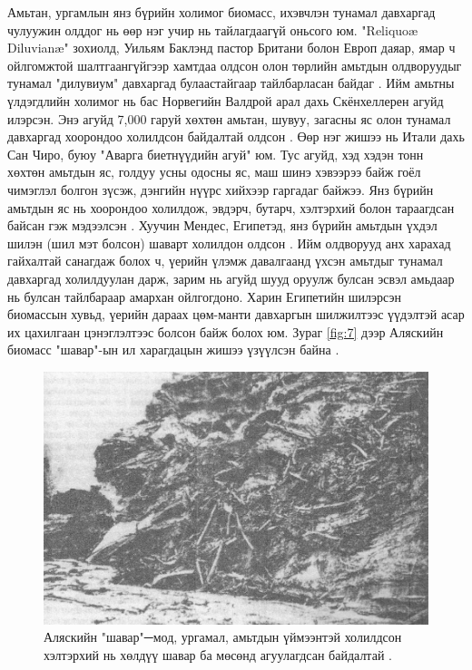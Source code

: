 \documentclass[10pt,twocolumn,letterpaper]{article}
\begin{document}
Амьтан, ургамлын янз бүрийн холимог биомасс, ихэвчлэн тунамал давхаргад чулуужин олддог нь өөр нэг учир нь тайлагдаагүй оньсого юм. "Reliquoæ Diluvianæ" зохиолд, Уильям Баклэнд пастор Британи болон Европ даяар, ямар ч ойлгомжтой шалтгаангүйгээр хамтдаа олдсон олон төрлийн амьтдын олдворуудыг тунамал "дилувиум" давхаргад булаастайгаар тайлбарласан байдаг \cite{58}. Ийм амьтны үлдэгдлийн холимог нь бас Норвегийн Валдрой арал дахь Скёнхеллерен агуйд илэрсэн. Энэ агуйд 7,000 гаруй хөхтөн амьтан, шувуу, загасны яс олон тунамал давхаргад хоорондоо холилдсон байдалтай олдсон \cite{59}. Өөр нэг жишээ нь Итали дахь Сан Чиро, буюу "Аварга биетнүүдийн агуй" юм. Тус агуйд, хэд хэдэн тонн хөхтөн амьтдын яс, голдуу усны одосны яс, маш шинэ хэвээрээ байж гоёл чимэглэл болгон зүсэж, дэнгийн нүүрс хийхээр гаргадаг байжээ. Янз бүрийн амьтдын яс нь хоорондоо холилдож, эвдэрч, бутарч, хэлтэрхий болон тараагдсан байсан гэж мэдээлсэн \cite{60,61}. Хуучин Мендес, Египетэд, янз бүрийн амьтдын үхдэл шилэн (шил мэт болсон) шаварт холилдон олдсон \cite{57}. Ийм олдворууд анх харахад гайхалтай санагдаж болох ч, үерийн үлэмж давалгаанд үхсэн амьтдыг тунамал давхаргад холилдуулан дарж, зарим нь агуйд шууд оруулж булсан эсвэл амьдаар нь булсан тайлбараар амархан ойлгогдоно. Харин Египетийн шилэрсэн биомассын хувьд, үерийн дараах цөм-манти давхаргын шилжилтээс үүдэлтэй асар их цахилгаан цэнэглэлтээс болсон байж болох юм. Зураг \ref{fig:7} дээр Аляскийн биомасс "шавар"-ын ил харагдацын жишээ үзүүлсэн байна \cite{56}.

\begin{figure}[t]
\begin{center}
   \includegraphics[width=1\linewidth]{muck-crop.jpeg}
\end{center}
   \caption{Аляскийн "шавар"─мод, ургамал, амьтдын үймээнтэй холилдсон хэлтэрхий нь хөлдүү шавар ба мөсөнд агуулагдсан байдалтай \cite{146}.}
\label{fig:7}
\label{fig:onecol}
\end{figure}
\end{document}
